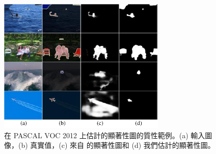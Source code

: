 \begin{figure}[t]
\centering
\includegraphics[width=8cm]{figures/fig_saliency_v2.pdf}
\caption{在 PASCAL VOC 2012 上估計的顯著性圖的質性範例。(a) 輸入圖像，(b) 真實值，(c) 來自 \cite{zhao2019pyramid} 的顯著性圖和 (d) 我們估計的顯著性圖。} \vspace{-2mm}
\label{fig:sal}
\end{figure}
